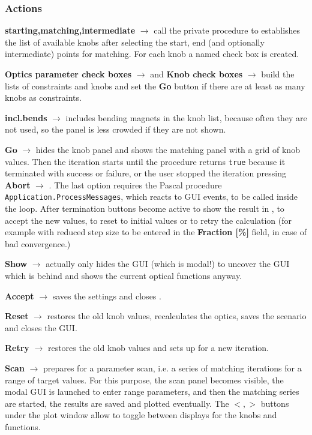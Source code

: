 \documentclass[12pt]{article}
\newcommand\code[1]{{\tt #1}}
\newcommand{\ofld}[1]{\colorbox{black!15}{{\bf #1}}}
\newcommand\guico[1]{{\color{blue}\code{#1}}}
\newcommand{\evcod}[2]{\ofld{#1} $\rightarrow$ \guico{#2}}
\newcommand{\opagui}[1]{\colorbox{blue!20}{{\color{black}\code{#1}}}}
\newcommand{\ogui}[1]{\hyperref[#1]{\opagui{#1}}}
\newcommand{\act}[1]{\subsubsection*{Actions} #1}
\begin{document}
\act{
\evcod{starting,matching,intermediate}{(ini,mat,mid)pointChange} call the private procedure \guico{knoblist} to establishes the list of available knobs after selecting the start, end (and optionally intermediate) points for matching. For each knob a named check box is created.

\evcod{Optics parameter check boxes}{cselClick} and \evcod{Knob check boxes}{knobSelect} build the lists of constraints and knobs and set the \ofld{Go} button if there are at least as many knobs as constraints.

\evcod{incl.bends}{cbxIncBendsClick} includes bending magnets in the knob list, because often they are not used, so the panel is less crowded if they are not shown.

\evcod{Go}{gobutClick} hides the knob panel\guico{panknobs} and shows the matching panel \guico{panmat} with a grid of knob values. Then the iteration starts until the procedure \guico{Step} returns \code{true} because it terminated with success or failure, or the user stopped the iteration pressing \evcod{Abort}{bustopClick}. The last option requires the Pascal procedure \code{Application.ProcessMessages}, which reacts to GUI events, to be called inside the loop. After termination buttons become active to show the result in \ogui{opalinop}, to accept the new values, to reset to initial values or to retry the calculation (for example with reduced step size to be entered in the \ofld{Fraction [\%]} field, in case of bad convergence.)

\evcod{Show}{butShowClick} actually only hides the \ogui{omatching} GUI (which is modal!) to  uncover the \ogui{opalinop} GUI which is behind and shows the current optical functions anyway.

\evcod{Accept}{butaccClick} saves the settings and closes \ogui{omatching}.

\evcod{Reset}{butaccresClick} restores the old knob values, recalculates the optics, saves the scenario and closes the GUI.

\evcod{Retry}{butrtyClick} restores the old knob values and sets up for a new iteration.

\evcod{Scan}{ScanClick} prepares for a parameter scan, i.e. a series of matching iterations for a range of target values. For this purpose, the scan panel \guico{panfig} becomes visible, the modal GUI \ogui{omatchscan} is launched to enter range parameters, and then the matching series are started, the results are saved and plotted eventually. The \ofld{$<,>$} buttons under the plot window allow to toggle between displays for the knobs and functions.
}
\end{document}
